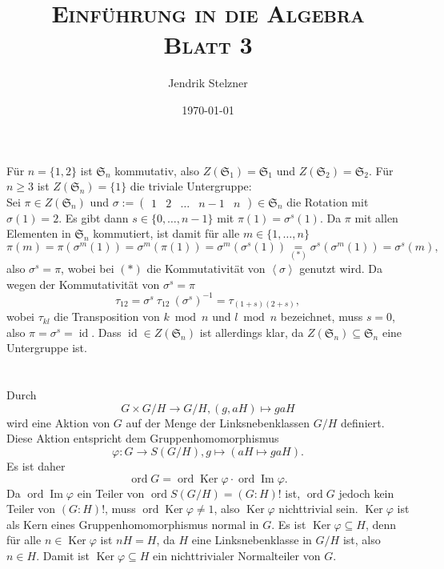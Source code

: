 \documentclass[a4paper,10pt]{article}
\title{\textsc{Einführung in die Algebra \\ \Large Blatt 3}}
\author{Jendrik Stelzner}
\date{\today}
\theoremstyle{definition}
\newcommand{\Sn}{\mathfrak{S}}
\newcommand{\id}{\operatorname{id}}
\newcommand{\ord}{\operatorname{ord}}
\newcommand{\Img}{\operatorname{Im}}
\newcommand{\Ker}{\operatorname{Ker}}
\newcommand{\vect}[1]{\begin{pmatrix}#1\end{pmatrix}}
\newcommand{\gen}[1]{\left\langle#1\right\rangle}
\begin{document}
\maketitle





\section{}
Für $n = \{1,2\}$ ist $\Sn_n$ kommutativ, also $Z(\Sn_1) = \Sn_1$ und $Z(\Sn_2) = \Sn_2$. Für $n \geq 3$ ist $Z(\Sn_n) = \{1\}$ die triviale Untergruppe:\\
Sei $\pi \in Z(\Sn_n)$ und $\sigma := \vect{1&2&\ldots&n-1&n} \in \Sn_n$ die Rotation mit $\sigma(1)=2$. Es gibt dann $s \in \{0,\ldots,n-1\}$ mit $\pi(1) = \sigma^s(1)$. Da $\pi$ mit allen Elementen in $\Sn_n$ kommutiert, ist damit für alle $m \in \{1,\ldots,n\}$
\[
 \pi(m)
 = \pi(\sigma^m(1))
 = \sigma^m(\pi(1))
 = \sigma^m(\sigma^s(1))
 \underset{(*)}{=} \sigma^s(\sigma^m(1))
 = \sigma^s(m),
\]
also $\sigma^s = \pi$, wobei bei $(*)$ die Kommutativität von $\gen{\sigma}$ genutzt wird. Da wegen der Kommutativität von $\sigma^s = \pi$
\[
 \tau_{12} = \sigma^s\ \tau_{12}\ (\sigma^s)^{-1} = \tau_{(1+s)(2+s)},
\]
wobei $\tau_{kl}$ die Transposition von $k \bmod n$ und $l \bmod n$ bezeichnet, muss $s = 0$, also $\pi = \sigma^s = \id$. Dass $\id \in Z(\Sn_n)$ ist allerdings klar, da $Z(\Sn_n) \subseteq \Sn_n$ eine Untergruppe ist.





\section{}





\section{}


\subsection{}\label{ssec:fak}
Durch
\[
 G \times G/H \rightarrow G/H, (g,aH) \mapsto gaH
\]
wird eine Aktion von $G$ auf der Menge der Linksnebenklassen $G/H$ definiert. Diese Aktion entspricht dem Gruppenhomomorphismus
\[
 \varphi : G \rightarrow S(G/H), g \mapsto (aH \mapsto gaH).
\]
Es ist daher
\[
 \ord G
 = \ord \Ker \varphi \cdot \ord \Img \varphi.
\]
Da $\ord \Img \varphi$ ein Teiler von $\ord S(G/H) = (G:H)!$ ist, $\ord G$ jedoch kein Teiler von $(G : H)!$, muss $\ord \Ker \varphi \neq 1$, also $\Ker \varphi$ nichttrivial sein. $\Ker \varphi$ ist als Kern eines Gruppenhomomorphismus normal in $G$. Es ist $\Ker \varphi \subseteq H$, denn für alle $n \in \Ker \varphi$ ist $nH = H$, da $H$ eine Linksnebenklasse in $G/H$ ist, also $n \in H$. Damit ist $\Ker \varphi \subseteq H$ ein nichttrivialer Normalteiler von $G$.
\end{document}
